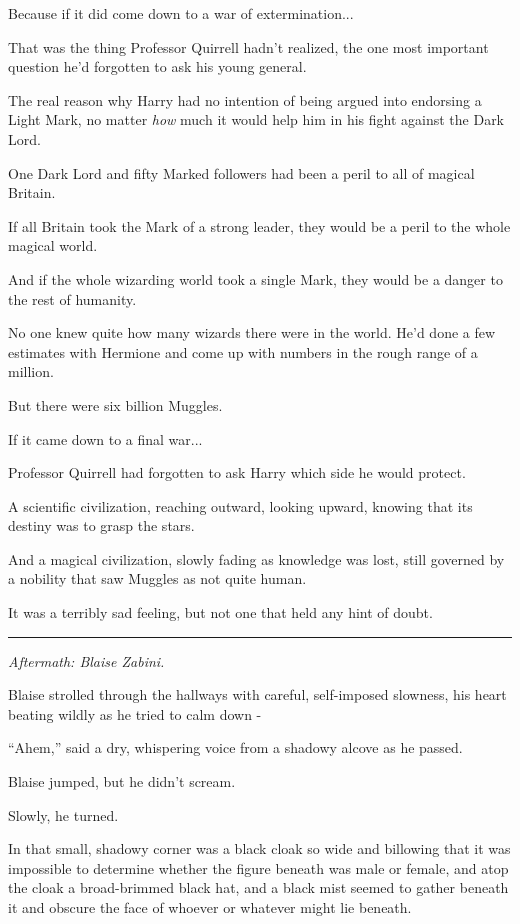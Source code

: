Because if it did come down to a war of extermination...

That was the thing Professor Quirrell hadn't realized, the one most
important question he'd forgotten to ask his young general.

The real reason why Harry had no intention of being argued into
endorsing a Light Mark, no matter \emph{how} much it would help him in
his fight against the Dark Lord.

One Dark Lord and fifty Marked followers had been a peril to all of
magical Britain.

If all Britain took the Mark of a strong leader, they would be a peril
to the whole magical world.

And if the whole wizarding world took a single Mark, they would be a
danger to the rest of humanity.

No one knew quite how many wizards there were in the world. He'd done a
few estimates with Hermione and come up with numbers in the rough range
of a million.

But there were six billion Muggles.

If it came down to a final war...

Professor Quirrell had forgotten to ask Harry which side he would
protect.

A scientific civilization, reaching outward, looking upward, knowing
that its destiny was to grasp the stars.

And a magical civilization, slowly fading as knowledge was lost, still
governed by a nobility that saw Muggles as not quite human.

It was a terribly sad feeling, but not one that held any hint of doubt.

\begin{center}\rule{3in}{0.4pt}\end{center}

\emph{Aftermath: Blaise Zabini.}

Blaise strolled through the hallways with careful, self-imposed
slowness, his heart beating wildly as he tried to calm down -

``Ahem,'' said a dry, whispering voice from a shadowy alcove as he
passed.

Blaise jumped, but he didn't scream.

Slowly, he turned.

In that small, shadowy corner was a black cloak so wide and billowing
that it was impossible to determine whether the figure beneath was male
or female, and atop the cloak a broad-brimmed black hat, and a black
mist seemed to gather beneath it and obscure the face of whoever or
whatever might lie beneath.

